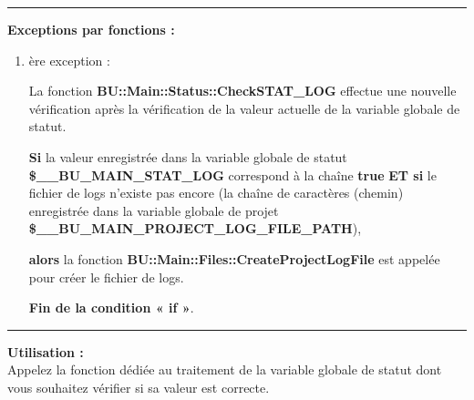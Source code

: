 \documentclass[a4paper,10pt]{article}
\begin{document}

\par\noindent\rule{\textwidth}{0.4pt}

\begin{justify}
    \textbf{Exceptions par fonctions :}
\end{justify}

\begin{justify}
    \begin{enumerate}
        \item
        {
            ère exception :

            \begin{justify}
                La fonction \textbf{\color{mauve}BU::Main::Status::CheckSTAT\_LOG} effectue une nouvelle vérification après la vérification de la valeur actuelle de la variable globale de statut.
            \end{justify}

            \begin{justify}
                \textbf{\color{cond}Si} la valeur enregistrée dans la variable globale de statut \textbf{\color{vars}\$\_\_BU\_MAIN\_STAT\_LOG} correspond à la chaîne \textbf{true} \textbf{\color{cond}ET si} le fichier de logs n'existe pas encore (la chaîne de caractères (chemin) enregistrée dans la variable globale de projet \textbf{\color{vars}\$\_\_BU\_MAIN\_PROJECT\_LOG\_FILE\_PATH}),
            \end{justify}

            \begin{justify}
                \textbf{\color{cond} alors} la fonction \textbf{\color{mauve}BU::Main::Files::CreateProjectLogFile} est appelée pour créer le fichier de logs.
            \end{justify}

            \begin{justify}
                \textbf{\color{cond}Fin de la condition « if »}.
            \end{justify}
        }
    \end{enumerate}
\end{justify}


\par\noindent\rule{\textwidth}{0.4pt}

\begin{justify}
    \textbf{Utilisation :}\\[1\baselineskip]
    Appelez la fonction dédiée au traitement de la variable globale de statut dont vous souhaitez vérifier si sa valeur est correcte.
\end{justify}
\end{document}
